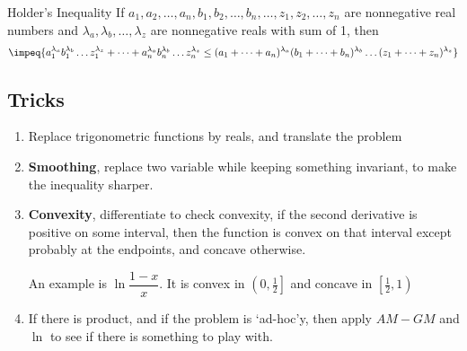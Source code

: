 


{Holder's Inequality}{
    If $a_1, a_2, \dotsc, a_n, b_1, b_2, \dotsc, b_n, \dotsc, z_1, z_2,
    \dotsc, z_n$ are nonnegative real numbers and $\lambda_a, \lambda_b,
    \dotsc, \lambda_z$ are nonnegative reals with sum of 1, then 
    \[\impeq{a_1^{\lambda_a}b_1^{\lambda_b} \dots z_1^{\lambda_z} + \dots +
    a_n^{\lambda_a} b_n^{\lambda_b} \dots z_n^{\lambda_z}  \leq (a_1 + \dots +
    a_n)^{\lambda_a} (b_1 + \dots + b_n)^{\lambda_b} \dots (z_1 + \dots +
    z_n)^{\lambda_z}}\] 
}






\newpage
\subsection{Tricks}


\begin{take_note*}[title={Some tricks to try}]{}
    \begin{enumerate}[left=0pt, label=\bfseries\arabic*., itemsep=5pt]
        \item Replace trigonometric functions by reals, and translate the problem
        \item \textbf{Smoothing}, replace two variable while keeping something
            invariant, to make the inequality sharper.
        \item \textbf{Convexity}, differentiate to check convexity, if the
            second derivative is positive on some interval, then the function
            is convex on that interval except probably at the endpoints, and
            concave otherwise.

            An example is $\ln \dfrac{1-x}{x}$. It is convex in
            $\left(0,\frac{1}{2} \right] $ and concave in $ \left[\frac{1}{2}, 1\right) $
        \item If there is product, and if the problem is `ad-hoc'y, then apply
            $ AM-GM $ and $ \ln $ to see if there is something to play with.
    \end{enumerate}
\end{take_note*}



